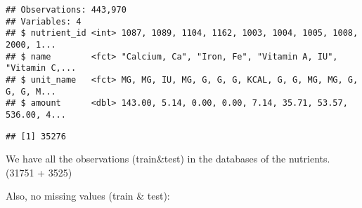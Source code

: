 \documentclass[
]{article}
\newenvironment{Shaded}{\begin{snugshade}}{\end{snugshade}}
\newcommand{\DecValTok}[1]{\textcolor[rgb]{0.00,0.00,0.81}{#1}}
\newcommand{\KeywordTok}[1]{\textcolor[rgb]{0.13,0.29,0.53}{\textbf{#1}}}
\newcommand{\NormalTok}[1]{#1}
\newcommand{\OperatorTok}[1]{\textcolor[rgb]{0.81,0.36,0.00}{\textbf{#1}}}
\newcommand{\StringTok}[1]{\textcolor[rgb]{0.31,0.60,0.02}{#1}}
\begin{document}
\begin{Shaded}
\end{Shaded}

\begin{verbatim}
## Observations: 443,970
## Variables: 4
## $ nutrient_id <int> 1087, 1089, 1104, 1162, 1003, 1004, 1005, 1008, 2000, 1...
## $ name        <fct> "Calcium, Ca", "Iron, Fe", "Vitamin A, IU", "Vitamin C,...
## $ unit_name   <fct> MG, MG, IU, MG, G, G, G, KCAL, G, G, MG, MG, G, G, G, M...
## $ amount      <dbl> 143.00, 5.14, 0.00, 0.00, 7.14, 35.71, 53.57, 536.00, 4...
\end{verbatim}

\begin{Shaded}
\end{Shaded}

\begin{verbatim}
## [1] 35276
\end{verbatim}

We have all the observations (train\&test) in the databases of the
nutrients. (31751 + 3525)

Also, no missing values (train \& test):

\begin{Shaded}
\end{Shaded}
\end{document}

